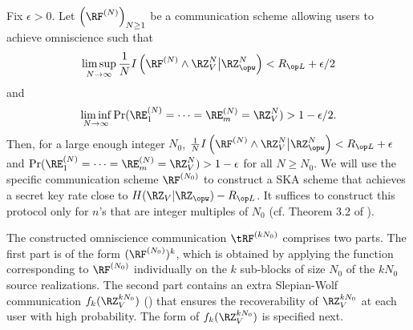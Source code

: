 Fix $\epsilon>0$. Let $\left(\RF^{(N)}\right)_{N\geq 1}$ be a communication scheme allowing users to achieve omniscience such that
\begin{align}
    \limsup_{N \to \infty} \frac{1}{N}I\left(\RF^{(N)} \wedge \RZ_V^N \big| \RZ_{\opw}^N\right) < \rl + \epsilon/2
\end{align}
and 
\begin{align}
\liminf_{N \to \infty} \Pr(\RE_1^{(N)} = \dots =\RE_m^{(N)} = \RZ_V^N) >1-\epsilon/2.
\end{align}
%
Then, for a large enough integer $N_0$,  $\frac{1}{N}I\left(\RF^{(N)} \wedge \RZ_V^N \big| \RZ_{\opw}^N\right) < \rl + \epsilon$ and $\Pr(\RE_1^{(N)} = \dots =\RE_m^{(N)} = \RZ_V^N) >1-\epsilon$  for all  $N \geq N_0$. We will use the specific communication scheme $\RF^{(N_0)}$ to construct a SKA scheme that achieves a secret key rate close to $H(\RZ_V|\RZ_{\opw})-\rl$. It suffices to construct this protocol only for $n$'s that are integer multiples of $N_0$ (cf. Theorem 3.2 of \cite{csiszar08}).



The constructed omniscience communication $\tRF^{(kN_0)}$ comprises two parts. The first part is of the form $(\RF^{(N_0)})^k$, which is obtained by applying the function corresponding to $\RF^{(N_0)}$ individually on the $k$ sub-blocks of size $N_0$ of the $kN_0$ source realizations. The second part contains an extra Slepian-Wolf communication $f_k(\RZ_V^{kN_0})$ (\cite[Lemma~3.1]{csiszar08}) that ensures the recoverability of $\RZ_V^{kN_0}$ at each user with high probability. The form of  $f_k(\RZ_V^{kN_0})$ is specified next.

